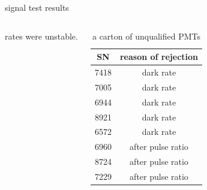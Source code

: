 \documentclass{beamer}
\begin{document}
\begin{frame}{signal test results}
\begin{columns}[c]
	rates were unstable.
\centering
	\begin{table}
	\begin{tabular}{|c|c|}
		\hline
		\textbf{SN}&\textbf{reason of rejection}\\
		\hline
		{\color{cyan}7418}	&dark rate\\
		{\color{cyan}7005}	&dark rate\\
		{\color{cyan}6944}	&dark rate\\
		{\color{cyan}8921}	&dark rate\\
		{\color{cyan}6572}	&dark rate\\
		{\color{cyan}6960}	&after pulse ratio\\
		{\color{cyan}8724}	&after pulse ratio\\
		{\color{cyan}7229}	&after pulse ratio\\
		\hline
	\end{tabular}
	\caption{a carton of unqualified PMTs}
	\label{uqPMT}
	\end{table}
\end{columns}
\end{frame}
\end{document}
